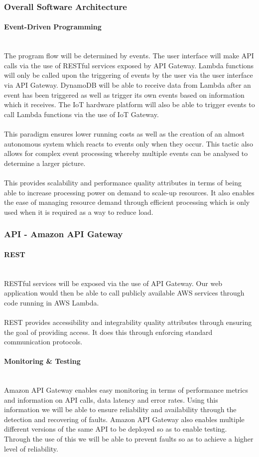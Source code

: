 \documentclass{article}
\begin{document}
	\subsubsection{Overall Software Architecture}
		\paragraph{Event-Driven Programming}\mbox{}\\
		The program flow will be determined by events. The user interface will make API calls via the use of RESTful services exposed by API Gateway. Lambda functions will only be called upon the triggering of events by the user via the user interface via API Gateway. DynamoDB will be able to receive data from Lambda after an event has been triggered as well as trigger its own events based on information which it receives. The IoT hardware platform will also be able to trigger events to call Lambda functions via the use of IoT Gateway.\\\\
		This paradigm ensures lower running costs as well as the creation of an almost autonomous system which reacts to events only when they occur. This tactic also allows for complex event processing whereby multiple events can be analysed to determine a larger picture.\\\\
		This provides scalability and performance quality attributes in terms of being able to increase processing power on demand to scale-up resources. It also enables the ease of managing resource demand through efficient processing which is only used when it is required as a way to reduce load.
	\subsubsection{API - Amazon API Gateway}
		\paragraph{REST}\mbox{}\\
		RESTful services will be exposed via the use of API Gateway. Our web application would then be able to call publicly available AWS services through code running in AWS Lambda.\\\\
		REST provides accessibility and integrability quality attributes through ensuring the goal of providing access. It does this through enforcing standard communication protocols.
		\paragraph{Monitoring \& Testing}\mbox{}\\
		Amazon API Gateway enables easy monitoring in terms of performance metrics and information on API calls, data latency and error rates. Using this information we will be able to ensure reliability and availability through the detection and recovering of faults. Amazon API Gateway also enables multiple different versions of the same API to be deployed so as to enable testing. Through the use of this we will be able to prevent faults so as to achieve a higher level of reliability.
\end{document}
